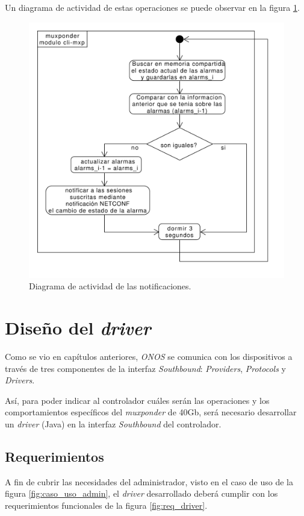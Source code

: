   Un diagrama de actividad de estas operaciones se puede observar en la figura \ref{fig:actividad_modulo_notif}.

  \begin{figure}[H]
    \centering
    \includegraphics[scale=0.50]{Figures/actividad_modulo_notif.pdf}
    \caption{Diagrama de actividad de las notificaciones.}
    \label{fig:actividad_modulo_notif}
  \end{figure}


  \section{Diseño del \textit{driver}}
  Como se vio en capítulos anteriores, \textit{ONOS} se comunica con los dispositivos a través de tres componentes de la interfaz \textit{Southbound}: \textit{Providers}, \textit{Protocols} y \textit{Drivers}.
  
  Así, para poder indicar al controlador cuáles serán las operaciones y los comportamientos específicos del \textit{muxponder} de 40Gb, será necesario desarrollar un \textit{driver} (Java) en la interfaz \textit{Southbound} del controlador. 

  \subsection{Requerimientos}
  A fin de cubrir las necesidades del administrador, visto en el caso de uso de la figura \ref{fig:caso_uso_admin}, el \textit{driver} desarrollado deberá cumplir con los requerimientos funcionales de la figura \ref{fig:req_driver}.
  
